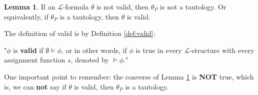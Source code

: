 \documentclass[11pt,letterpaper]{book}
\theoremstyle{definition}
\newtheorem{lemma}{Lemma}[section]
\begin{document}
\begin{lemma}\label{lemma:tautology_valid}
If an $\mathcal{L}$-formula $\theta$ is not valid, then $\theta_P$ is
not a tautology. Or equivalently, if $\theta_P$ is a tautology, then
$\theta$ is valid.
\end{lemma}

The definition of valid is by Definition \ref{def:valid}:

"$\phi$ is \textbf{valid} if
$\emptyset \models \phi$, or in other words, if $\phi$ is true in every
$\mathcal{L}$-structure with every assignment function $s$, denoted by
$\models \phi$."

One important point to remember: the converse of Lemma
\ref{lemma:tautology_valid} is \textbf{NOT} true, which is, we can
\textbf{not} say if $\theta$ is valid, then $\theta_P$ is a tautology.
\end{document}

